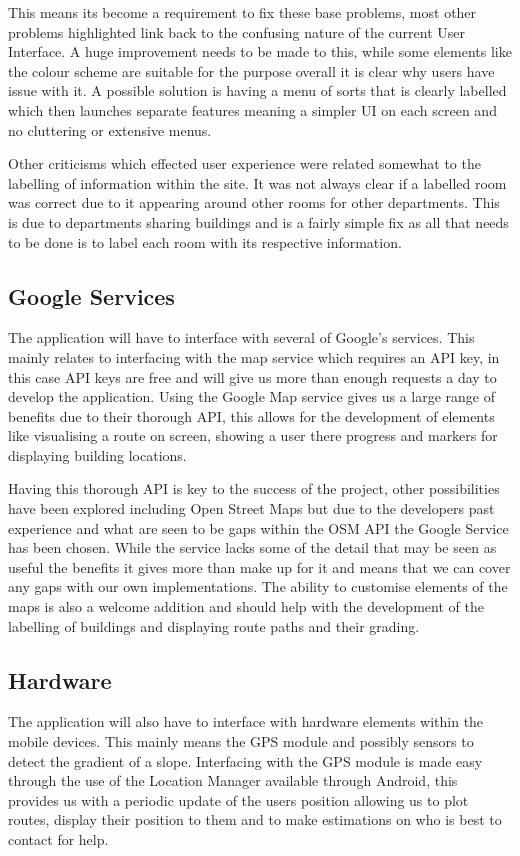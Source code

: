 \documentclass[10pt,a4paper]{article}
\begin{document}
This means its become a requirement to fix these base problems, most other problems highlighted link back to the confusing nature of the current User Interface. A huge improvement needs to be made to this, while some elements like the colour scheme are suitable for the purpose overall it is clear why users have issue with it. A possible solution is having a menu of sorts that is clearly labelled which then launches separate features meaning a simpler UI on each screen and no cluttering or extensive menus. 

Other criticisms which effected user experience were related somewhat to the labelling of information within the site. It was not always clear if a labelled room was correct due to it appearing around other rooms for other departments. This is due to departments sharing buildings and is a fairly simple fix as all that needs to be done is to label each room with its respective information. 
\subsection{Google Services}
The application will have to interface with several of Google's services. This mainly relates to interfacing with the map service which requires an API key, in this case API keys are free and will give us more than enough requests a day to develop the application. Using the Google Map service gives us a large range of benefits due to their thorough API, this allows for the development of elements like visualising a route on screen, showing a user there progress and markers for displaying building locations. 

Having this thorough API is key to the success of the project, other possibilities have been explored including Open Street Maps but due to the developers past experience and what are seen to be gaps within the OSM API the Google Service has been chosen. While the service lacks some of the detail that may be seen as useful the benefits it gives more than make up for it and means that we can cover any gaps with our own implementations. The ability to customise elements of the maps is also a welcome addition and should help with the development of the labelling of buildings and displaying route paths and their grading. 
\subsection{Hardware}
The application will also have to interface with hardware elements within the mobile devices. This mainly means the GPS module and possibly sensors to detect the gradient of a slope. Interfacing with the GPS module is made easy through the use of the Location Manager available through Android, this provides us with a periodic update of the users position allowing us to plot routes, display their position to them and to make estimations on who is best to contact for help.
\end{document}

